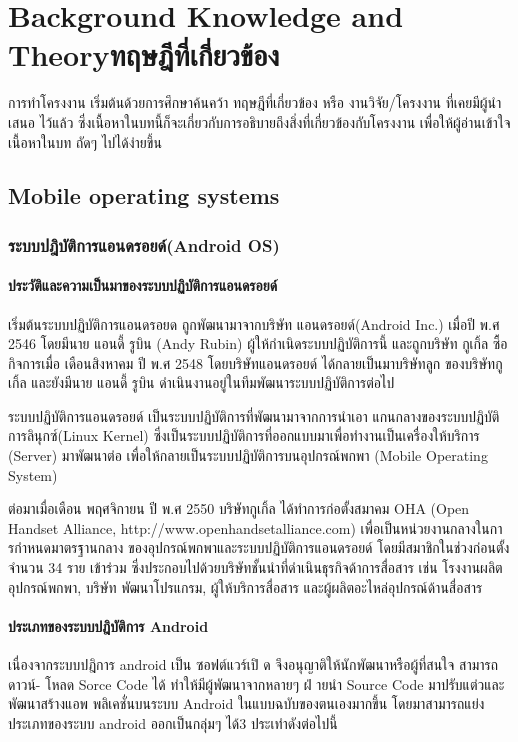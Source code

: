 \chapter{\ifenglish Background Knowledge and Theory\else ทฤษฎีที่เกี่ยวข้อง\fi}
\quad \quad  การทําโครงงาน เริ่มต้นด้วยการศึกษาค้นคว้า ทฤษฎีที่เกี่ยวข้อง หรือ งานวิจัย/โครงงาน ที่เคยมีผู้นําเสนอ
ไว้แล้ว ซึ่งเนื้อหาในบทนี้ก็จะเกี่ยวกับการอธิบายถึงสิ่งที่เกี่ยวข้องกับโครงงาน เพื่อให้ผู้อ่านเข้าใจเนื้อหาในบท
ถัดๆ ไปได้ง่ายขึ้น
\section{Mobile operating systems}
\subsection{ระบบปฎิบัติการแอนดรอยด์(Android OS)}
\subsubsection{ประวัติและความเป็นมาของระบบปฏิบัติการแอนดรอยด์}

\quad \quad เริ่มต้นระบบปฏิบัติการแอนดรอยด \cite{android} ถูกพัฒนามาจากบริษัท แอนดรอยด์(Android Inc.) เมื่อปี
พ.ศ 2546 โดยมีนาย แอนดี้ รูบิน (Andy Rubin) ผู้ให้กําเนิดระบบปฏิบัติการนี้ และถูกบริษัท กูเกิ้ล ซื้อ
กิจการเมื่อ เดือนสิงหาคม ปี พ.ศ 2548 โดยบริษัทแอนดรอยด์ ได้กลายเป็นมาบริษัทลูก ของบริษัทกูเกิ้ล
และยังมีนาย แอนดี้ รูบิน ดําเนินงานอยู่ในทีมพัฒนาระบบปฏิบัติการต่อไป

ระบบปฏิบัติการแอนดรอยด์ เป็นระบบปฏิบัติการที่พัฒนามาจากการนําเอา แกนกลางของระบบปฏิบัติ
การลินุกซ์(Linux Kernel) ซึ่งเป็นระบบปฏิบัติการที่ออกแบบมาเพื่อทํางานเป็นเครื่องให้บริการ (Server)
มาพัฒนาต่อ เพื่อให้กลายเป็นระบบปฏิบัติการบนอุปกรณ์พกพา (Mobile Operating System)

ต่อมาเมื่อเดือน พฤศจิกายน ปี พ.ศ 2550 บริษัทกูเกิ้ล ได้ทําการก่อตั้งสมาคม OHA (Open Handset Alliance, http://www.openhandsetalliance.com) เพื่อเป็นหน่วยงานกลางในการกําหนดมาตรฐานกลาง ของอุปกรณ์พกพาและระบบปฏิบัติการแอนดรอยด์ โดยมีสมาชิกในช่วงก่อนตั้งจํานวน 34 ราย
เข้าร่วม ซึ่งประกอบไปด้วยบริษัทชั้นนําที่ดําเนินธุรกิจด้าการสื่อสาร เช่น โรงงานผลิตอุปกรณ์พกพา, บริษัท
พัฒนาโปรแกรม, ผู้ให้บริการสื่อสาร และผู้ผลิตอะไหล่อุปกรณ์ด้านสื่อสาร


\subsubsection{ประเภทของระบบปฎิบัติการ Android}
\quad \quad เนื่องจากระบบปฎิการ android เป็น ซอฟต์แวร์เปิ ด จึงอนุญาติให้นักพัฒนาหรือผู้ที่สนใจ สามารถดาวน์-
โหลด Sorce Code ได้ ทําให้มีผู้พัฒนาจากหลายๆ ฝ่ ายนํา Source Code มาปรับแต่วและพัฒนาสร้างแอพ
พลิเคชั่นบนระบบ Android ในแบบฉบับของตนเองมากขึ้น โดยมาสามารถแย่งประเภทของระบบ android
ออกเป็นกลุ่มๆ ได้3 ประเทําดังต่อไปนี้

